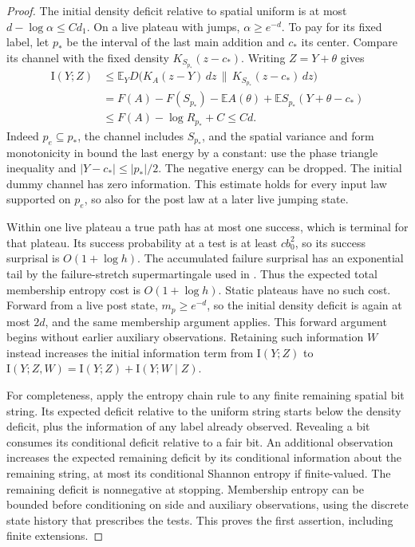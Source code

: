 \begin{proof}
The initial density deficit relative to spatial uniform is at most
$d-\log\alpha\le C d_1$. On a live plateau with jumps,
$\alpha\ge e^{-d}$. To pay for its fixed label, let $p_*$ be the interval
of the last main addition and $c_*$ its center. Compare its channel with the
fixed density $K_{S_{p_*}}(z-c_*)$. Writing $Z=Y+\theta$ gives
\[
 \begin{split}
 \mathrm I(Y;Z)&\le\mathbb E_Y
    D\bigl(K_A(z-Y)\,dz\,\|\,K_{S_{p_*}}(z-c_*)\,dz\bigr)\\
 &=F(A)-F(S_{p_*})-\mathbb E A(\theta)
       +\mathbb E S_{p_*}(Y+\theta-c_*)\\
 &\le F(A)-\log R_{p_*}+C\le Cd.
 \end{split}
\]
Indeed $p_e\subseteq p_*$, the channel includes $S_{p_*}$, and the spatial
variance and form monotonicity in  bound the last energy
by a constant: use the phase triangle inequality and
$|Y-c_*|\le |p_*|/2$. The negative energy can be dropped. The initial
dummy channel has zero information. This estimate holds for every input
law supported on $p_e$, so also for the post law at a later live jumping
state.

Within one live plateau a true path has at most one success, which is
terminal for that plateau. Its success probability at a test is at least
$c b_0^2$, so its success surprisal is $O(1+\log h)$. The accumulated
failure surprisal has an exponential tail by the failure-stretch
supermartingale used in . Thus the expected total
membership entropy cost is $O(1+\log h)$. Static plateaus have no such cost.
Forward from a live post state, $m_p\ge e^{-d}$, so the initial density
deficit is again at most $2d$, and the same membership argument applies.
This forward argument begins without earlier auxiliary observations.
Retaining such information $W$ instead increases the initial information
term from $\mathrm I(Y;Z)$ to
$\mathrm I(Y;Z,W)=\mathrm I(Y;Z)+\mathrm I(Y;W\mid Z)$.

For completeness, apply the entropy chain rule to any finite remaining
spatial bit string. Its expected deficit relative to the uniform string
starts below the density deficit, plus the information of any label already
observed. Revealing a bit consumes its conditional deficit relative to a
fair bit. An additional observation increases the expected remaining
deficit by its conditional information about the remaining string, at most
its conditional Shannon entropy if finite-valued. The remaining deficit is
nonnegative at stopping. Membership entropy can be bounded before
conditioning on side and auxiliary observations, using the discrete state
history that prescribes the tests. This proves the first assertion,
including finite extensions.


\end{proof}
